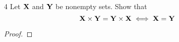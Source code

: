 \documentclass[11pt]{book}
\begin{document}
\begin{enumerate}
\begin{enumerate}
\begin{proof}
          Then $\bigcap_{(\alpha,\beta)} \sf{A}_{\alpha} \cup \sf{B}_{\beta}$ is got by apply Proposition 2.4(iii) again to right side of this equation.
          This method can be apply to the second equation of this proposition.
        \end{proof}
  \item[(iii)]
        $(\bigcap_{\alpha} \sf{A}_{\alpha})^{c} = \bigcup_{\alpha} \sf{A}^{c}_{\alpha}$ \\
        $(\bigcup_{\alpha} \sf{A}_{\alpha})^{c} = \bigcap_{\alpha} \sf{A}^{c}_{\alpha}$ (de Morgan's laws)

        \begin{proof}
          Write your proof here.
        \begin{align*}
        \end{align*}
        \end{proof}
\end{enumerate}

  \item[4] Let $\bf{X}$ and $\bf{Y}$ be nonempty sets. Show that
        $$\bf{X} \times \bf{Y} = \bf{Y} \times \bf{X} \iff \bf{X} = \bf{Y}$$
        \begin{proof}
        \end{proof}
        
\end{enumerate}
\end{document}
